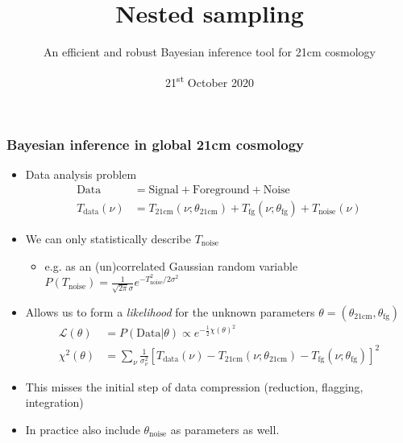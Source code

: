 \documentclass[aspectratio=169]{beamer}
\title{Nested sampling}
\subtitle{An efficient and robust Bayesian inference tool for 21cm cosmology}
\date{21\textsuperscript{st} October 2020}
\begin{document}
\begin{frame}
    \titlepage
\end{frame}

\begin{frame}
    \frametitle{Bayesian inference in global 21cm cosmology}
    \begin{itemize}
        \item Data analysis problem
            \begin{align}
                \text{Data} &= \text{Signal} + \text{Foreground} + \text{Noise} \nonumber\\
                T_\text{data}(\nu) &= T_\text{21cm}(\nu;\theta_\text{21cm}) + T_\text{fg}(\nu;\theta_\text{fg}) + T_\text{noise}(\nu)
                \nonumber
            \end{align}
        \item We  can only statistically describe $T_\text{noise}$ 
            \begin{itemize}
                \item e.g. as an (un)correlated Gaussian random variable $P(T_\text{noise}) = \frac{1}{\sqrt{2\pi}\sigma} e^{-T_\text{noise}^2/2\sigma^2}$
            \end{itemize}
        \item Allows us to form a {\em likelihood} for the unknown parameters $\theta = (\theta_\text{21cm},\theta_\text{fg})$
            \begin{align}
                \mathcal{L}(\theta) &= P(\text{Data}|\theta) \propto e^{-\frac{1}{2}\chi(\theta)^2} \nonumber\\
                \chi^2(\theta) &= \sum_\nu\frac{1}{\sigma_\nu^2}{\left[T_\text{data}(\nu)-T_\text{21cm}(\nu;\theta_\text{21cm}) - T_\text{fg}(\nu;\theta_\text{fg})\right]}^2
                \nonumber
            \end{align}
        \item This misses the initial step of data compression (reduction, flagging, integration)
        \item In practice also include $\theta_\text{noise}$ as parameters as well.
    \end{itemize}
\end{frame}
\end{document}
